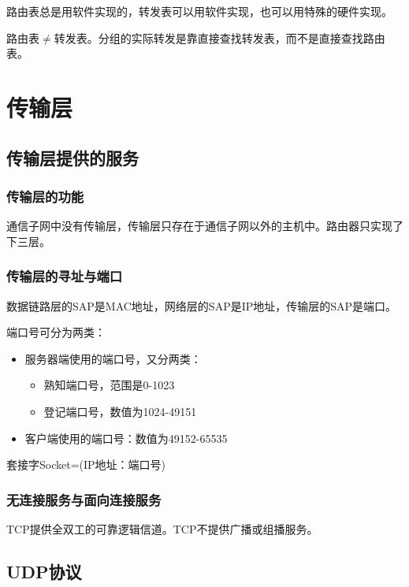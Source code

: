 \documentclass[12pt, a4paper, oneside]{ctexart}
\begin{document}
路由表总是用软件实现的，转发表可以用软件实现，也可以用特殊的硬件实现。

路由表$\neq$转发表。分组的实际转发是靠直接查找转发表，而不是直接查找路由表。

\section{传输层}

\subsection{传输层提供的服务}

\subsubsection{传输层的功能}

通信子网中没有传输层，传输层只存在于通信子网以外的主机中。路由器只实现了下三层。

\subsubsection{传输层的寻址与端口}

数据链路层的SAP是MAC地址，网络层的SAP是IP地址，传输层的SAP是端口。

端口号可分为两类：
\begin{itemize}
    \item 服务器端使用的端口号，又分两类：
    \begin{itemize}
        \item 熟知端口号，范围是0-1023
        \item 登记端口号，数值为1024-49151
    \end{itemize}
    \item 客户端使用的端口号：数值为49152-65535
\end{itemize}

套接字Socket=(IP地址：端口号)

\subsubsection{无连接服务与面向连接服务}

TCP提供全双工的可靠逻辑信道。TCP不提供广播或组播服务。

\subsection{UDP协议}
\end{document}
